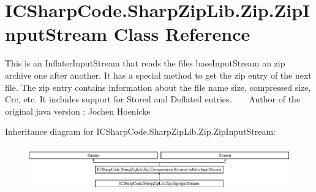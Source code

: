 \hypertarget{class_i_c_sharp_code_1_1_sharp_zip_lib_1_1_zip_1_1_zip_input_stream}{}\section{I\+C\+Sharp\+Code.\+Sharp\+Zip\+Lib.\+Zip.\+Zip\+Input\+Stream Class Reference}
\label{class_i_c_sharp_code_1_1_sharp_zip_lib_1_1_zip_1_1_zip_input_stream}


This is an Inflater\+Input\+Stream that reads the files base\+Input\+Stream an zip archive one after another. It has a special method to get the zip entry of the next file. The zip entry contains information about the file name size, compressed size, Crc, etc. It includes support for Stored and Deflated entries. ~\newline
 ~\newline
Author of the original java version \+: Jochen Hoenicke  


Inheritance diagram for I\+C\+Sharp\+Code.\+Sharp\+Zip\+Lib.\+Zip.\+Zip\+Input\+Stream\+:\begin{figure}[H]
\begin{center}
\leavevmode
\includegraphics[height=1.962617cm]{class_i_c_sharp_code_1_1_sharp_zip_lib_1_1_zip_1_1_zip_input_stream}
\end{center}
\end{figure}
